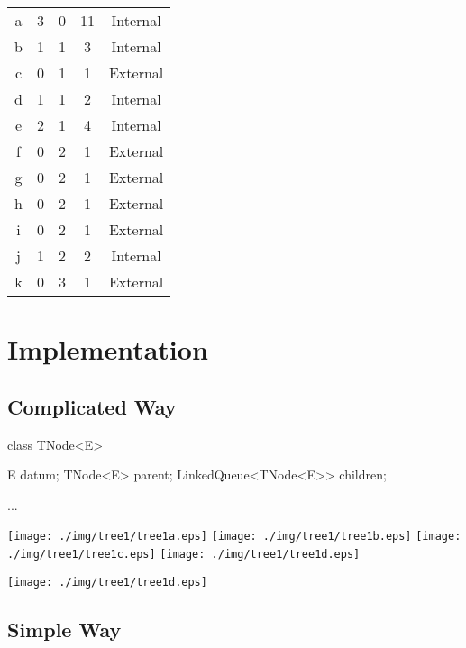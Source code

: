 \documentclass[a4paper, 9pt]{extarticle}
\begin{document}
\begin{center}
  \begin{tabular}{|c|c|c|c|c|}
    \hline
    a & 3 & 0 & 11 & Internal \\
    b & 1 & 1 & 3  & Internal \\
    c & 0 & 1 & 1  & External \\
    \hline
    d & 1 & 1 & 2 & Internal \\
    e & 2 & 1 & 4 & Internal \\
    f & 0 & 2 & 1 & External \\
    \hline
    g & 0 & 2 & 1 & External \\
    h & 0 & 2 & 1 & External \\
    i & 0 & 2 & 1 & External \\
    \hline
    j & 1 & 2 & 2 & Internal \\
    k & 0 & 3 & 1 & External \\
    \hline
  \end{tabular}
\end{center}



\section{Implementation}


\subsection{Complicated Way}

\begin{blackboard}
class TNode<E> {
    E datum;
    TNode<E> parent;
    LinkedQueue<TNode<E>> children;

    ...
}
\end{blackboard}

\texttt{[image: ./img/tree1/tree1a.eps]}
\texttt{[image: ./img/tree1/tree1b.eps]}
\texttt{[image: ./img/tree1/tree1c.eps]}
\texttt{[image: ./img/tree1/tree1d.eps]}

\begin{center}
\texttt{[image: ./img/tree1/tree1d.eps]}
\end{center}



\subsection{Simple Way}
\end{document}

